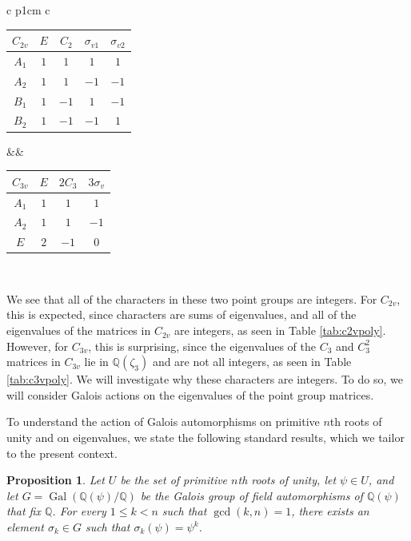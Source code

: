 \documentclass{article}
\DeclareMathOperator{\Gal}{Gal}
\newtheorem{proposition}{Proposition}
\begin{document}
    \begin{table}[htbp]
        \centering
        \renewcommand{\arraystretch}{1.5}
        \begin{tabular}{c p{1cm} c}
            \begin{tabular}{c|cccc}
                $C_{2v}$ & $E$ & $C_2$ & $\sigma_{v1}$ & $\sigma_{v2}$\\
                \hline
                $A_1$ & $1$ & $1$ & $1$ & $1$\\
                $A_2$ & $1$ & $1$ & $-1$ & $-1$\\
                $B_1$ & $1$ & $-1$ & $1$ & $-1$\\
                $B_2$ & $1$ & $-1$ & $-1$ & $1$\\
            \end{tabular}&&
            \begin{tabular}{c|ccc}
                $C_{3v}$ & $E$ & $2C_3$ & $3\sigma_{v}$\\
                \hline
                $A_1$ & $1$ & $1$ & $1$\\
                $A_2$ & $1$ & $1$ & $-1$\\
                $E$ & $2$ & $-1$ & $0$\\
            \end{tabular}\\
        \end{tabular}
    \end{table}

    \pagebreak

    We see that all of the characters in these two point groups are integers. For $C_{2v}$, this is expected, since characters are sums of eigenvalues, and all of the eigenvalues of the matrices in $C_{2v}$ are integers, as seen in Table \ref{tab:c2vpoly}. However, for $C_{3v}$, this is surprising, since the eigenvalues of the $C_3$ and $C_3^2$ matrices in $C_{3v}$ lie in $\mathbb{Q}(\zeta_3)$ and are not all integers, as seen in Table \ref{tab:c3vpoly}. We will investigate why these characters are integers. To do so, we will consider Galois actions on the eigenvalues of the point group matrices.

    To understand the action of Galois automorphisms on primitive $n$th roots of unity and on eigenvalues, we state the following standard results, which we tailor to the present context.

    \begin{proposition}
        Let $U$ be the set of primitive $n$th roots of unity, let $\psi\in U$, and let $G=\Gal(\mathbb{Q}(\psi)/\mathbb{Q})$ be the Galois group of field automorphisms of $\mathbb{Q}(\psi)$ that fix $\mathbb{Q}$. For every $1\le k < n$ such that $\gcd(k,n)=1$, there exists an element $\sigma_k\in G$ such that $\sigma_k(\psi)=\psi^k$.
        \label{prop:allprimitiverootsofunityarehit}
    \end{proposition}
\end{document}
